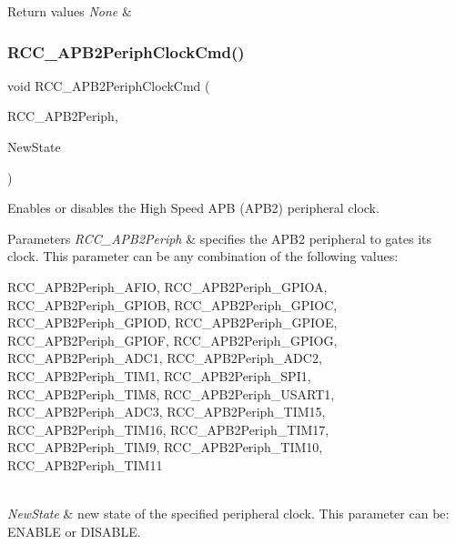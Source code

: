 \begin{DoxyRetVals}{Return values}
{\em None} & \\
\hline
\end{DoxyRetVals}
\mbox{\label{group___r_c_c___exported___functions_ga56ff55caf8d835351916b40dd030bc87}} 
\subsubsection{\texorpdfstring{RCC\_APB2PeriphClockCmd()}{RCC\_APB2PeriphClockCmd()}}
{\footnotesize\ttfamily void R\+C\+C\+\_\+\+A\+P\+B2\+Periph\+Clock\+Cmd (\begin{DoxyParamCaption}\item[{uint32\+\_\+t}]{R\+C\+C\+\_\+\+A\+P\+B2\+Periph,  }\item[{\mbox{\hyperlink{group___exported__types_gac9a7e9a35d2513ec15c3b537aaa4fba1}{Functional\+State}}}]{New\+State }\end{DoxyParamCaption})}



Enables or disables the High Speed A\+PB (A\+P\+B2) peripheral clock. 


\begin{DoxyParams}{Parameters}
{\em R\+C\+C\+\_\+\+A\+P\+B2\+Periph} & specifies the A\+P\+B2 peripheral to gates its clock. This parameter can be any combination of the following values\+: \begin{DoxyItemize}
\item R\+C\+C\+\_\+\+A\+P\+B2\+Periph\+\_\+\+A\+F\+IO, R\+C\+C\+\_\+\+A\+P\+B2\+Periph\+\_\+\+G\+P\+I\+OA, R\+C\+C\+\_\+\+A\+P\+B2\+Periph\+\_\+\+G\+P\+I\+OB, R\+C\+C\+\_\+\+A\+P\+B2\+Periph\+\_\+\+G\+P\+I\+OC, R\+C\+C\+\_\+\+A\+P\+B2\+Periph\+\_\+\+G\+P\+I\+OD, R\+C\+C\+\_\+\+A\+P\+B2\+Periph\+\_\+\+G\+P\+I\+OE, R\+C\+C\+\_\+\+A\+P\+B2\+Periph\+\_\+\+G\+P\+I\+OF, R\+C\+C\+\_\+\+A\+P\+B2\+Periph\+\_\+\+G\+P\+I\+OG, R\+C\+C\+\_\+\+A\+P\+B2\+Periph\+\_\+\+A\+D\+C1, R\+C\+C\+\_\+\+A\+P\+B2\+Periph\+\_\+\+A\+D\+C2, R\+C\+C\+\_\+\+A\+P\+B2\+Periph\+\_\+\+T\+I\+M1, R\+C\+C\+\_\+\+A\+P\+B2\+Periph\+\_\+\+S\+P\+I1, R\+C\+C\+\_\+\+A\+P\+B2\+Periph\+\_\+\+T\+I\+M8, R\+C\+C\+\_\+\+A\+P\+B2\+Periph\+\_\+\+U\+S\+A\+R\+T1, R\+C\+C\+\_\+\+A\+P\+B2\+Periph\+\_\+\+A\+D\+C3, R\+C\+C\+\_\+\+A\+P\+B2\+Periph\+\_\+\+T\+I\+M15, R\+C\+C\+\_\+\+A\+P\+B2\+Periph\+\_\+\+T\+I\+M16, R\+C\+C\+\_\+\+A\+P\+B2\+Periph\+\_\+\+T\+I\+M17, R\+C\+C\+\_\+\+A\+P\+B2\+Periph\+\_\+\+T\+I\+M9, R\+C\+C\+\_\+\+A\+P\+B2\+Periph\+\_\+\+T\+I\+M10, R\+C\+C\+\_\+\+A\+P\+B2\+Periph\+\_\+\+T\+I\+M11\end{DoxyItemize}
\\
\hline
{\em New\+State} & new state of the specified peripheral clock. This parameter can be\+: E\+N\+A\+B\+LE or D\+I\+S\+A\+B\+LE. \\
\hline
\end{DoxyParams}

